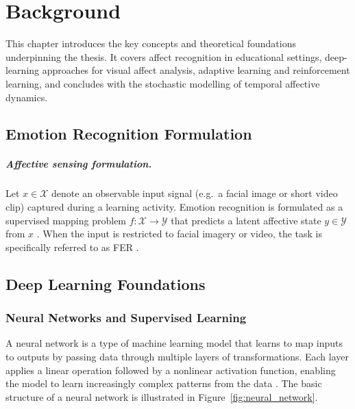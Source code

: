 \chapter{Background}\label{chap}

This chapter introduces the key concepts and theoretical foundations underpinning the thesis. It covers affect recognition in educational settings, deep-learning approaches for visual affect analysis, adaptive learning and reinforcement learning, and concludes with the stochastic modelling of temporal affective dynamics.

\section{Emotion Recognition Formulation}\label{sec:bg:affect}
\paragraph{Affective sensing formulation.}
Let $x \in \mathcal{X}$ denote an observable input signal (e.g.\ a facial image or short video clip) captured during a learning activity. Emotion recognition is formulated as a supervised mapping problem $f:\mathcal{X} \rightarrow \mathcal{Y}$ that predicts a latent affective state $y \in \mathcal{Y}$ from $x$
\cite{lek_academic_2023,florestiyanto_emotion_2024}. When the input is restricted to facial imagery or video, the task is specifically referred to as \ac{FER} \cite{lek_academic_2023}.
\section{Deep Learning Foundations}\label{sec:bg:dl}
\subsection{Neural Networks and Supervised Learning}

A neural network is a type of machine learning model that learns to map inputs to outputs by passing data through multiple layers of transformations. Each layer applies a linear operation followed by a nonlinear activation function, enabling the model to learn increasingly complex patterns from the data \cite{goodfellow2016deep}.
The basic structure of a neural network is illustrated in Figure~\ref{fig:neural_network}.

